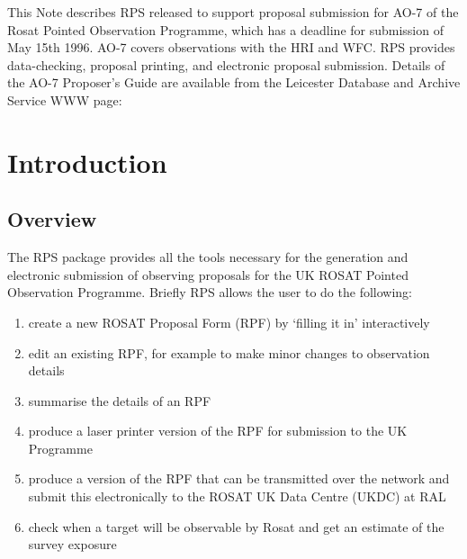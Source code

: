 
This Note describes RPS released to support proposal submission for
AO-7 of the Rosat Pointed Observation Programme, which has a deadline
for submission of May 15th 1996.  AO-7 covers observations with the HRI
and WFC. RPS provides data-checking, proposal printing, and electronic
proposal submission.  Details of the AO-7 Proposer's Guide are
available from the Leicester Database and Archive Service WWW page:

 \newpage
 \begin{latexonly}
   \setlength{\parskip}{0mm}
   \latexonlytoc
   \setlength{\parskip}{\medskipamount}
   \markright{\stardocname}
 \end{latexonly}
\newpage
\renewcommand{\thepage}{\arabic{page}}
\setcounter{page}{1}
 
\section{\label{se:introduction}Introduction}

\subsection{Overview}

The RPS package provides all the tools necessary for the generation and
electronic submission of observing proposals for the UK ROSAT Pointed 
Observation Programme. Briefly RPS allows the user to do the following:

\begin{enumerate}

\item create a new ROSAT Proposal Form (RPF) by `filling it in'
interactively

\item edit an existing RPF, for example to make minor changes to
observation details

\item summarise the details of an RPF

\item produce a laser printer version of the RPF for submission to the
UK Programme

\item produce a version of the RPF that can be transmitted over the
network and submit this electronically to the ROSAT UK Data Centre
(UKDC) at RAL

\item check when a target will be observable by Rosat and get an
estimate of the survey exposure

\end{enumerate}

